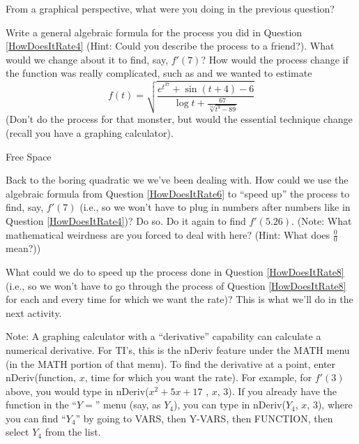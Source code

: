 \documentclass{ximera}
\begin{document}
\begin{question} 
From a graphical perspective, what were you doing in the previous question?
\end{question}

\begin{question}  \label{HowDoesItRate6}
Write a general algebraic formula for the process you did in Question \ref{HowDoesItRate4} (Hint:  Could you describe the process to a friend?).  What would we change about it to find, say, $f'(7)$?  How would the process change if the function was really complicated, such as   and we wanted to estimate 
\[
f(t) = \sqrt{\frac{e^{t^{37}}+\sin(t+4)-6}{\log t + \frac{67}{\sqrt[54]{t^9-89}}}}
\]
(Don't do the process for that monster, but would the essential technique change (recall you have a graphing calculator).
\end{question}
\begin{question}	
Free Space
\end{question}
\begin{question}\label{HowDoesItRate8}
Back to the boring quadratic we we've been dealing with.  How could we use the algebraic formula from Question \ref{HowDoesItRate6} to ``speed up'' the process to find, say, $f'(7)$ (i.e., so we won't have to plug in numbers after numbers like in Question \ref{HowDoesItRate4})?  Do so.  Do it again to find  $f'(5.26)$.  (Note: What mathematical weirdness are you forced to deal with here? (Hint:  What does $\frac{0}{0}$ mean?))
\end{question}
\begin{question}
What could we do to speed up the process done in Question \ref{HowDoesItRate8} (i.e., so we won't have to go through the process of Question \ref{HowDoesItRate8} for each and every time for which we want the rate)?  This is what we'll do in the next activity.
\end{question}

Note:  A graphing calculator with a ``derivative'' capability can calculate a numerical derivative.  For TI's, this is the nDeriv feature under the MATH menu (in the MATH portion of that menu).  To find the derivative at a point, enter nDeriv(function, $x$, time for which you want the rate).  For example, for $f'(3)$  above, you would type in nDeriv($x^2+5x+17$ , $x$, $3$).  If you already have the function in the ``$Y=$'' menu (say, as  $Y_4$), you can type in nDeriv($Y_4$, $x$, $3$), where you can find ``$Y_4$'' by going to VARS, then Y-VARS, then FUNCTION, then select $Y_4$  from the list.
\end{document}
